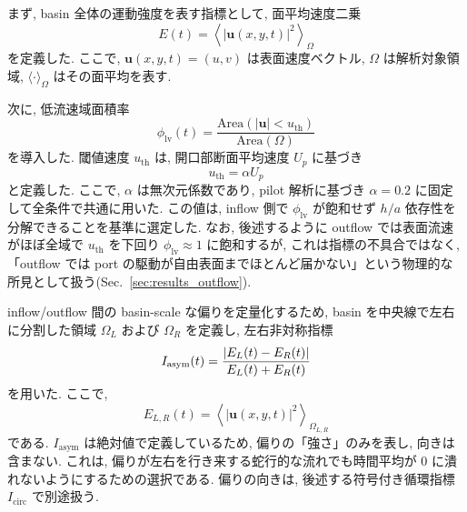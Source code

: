 まず, basin 全体の運動強度を表す指標として, 面平均速度二乗
\begin{equation}
E(t)=\left\langle |\mathbf{u}(x,y,t)|^2 \right\rangle_{\Omega}
\label{eq:E}
\end{equation}
を定義した. ここで, $\mathbf{u}(x,y,t)=(u,v)$ は表面速度ベクトル, $\Omega$ は解析対象領域, $\langle \cdot \rangle_{\Omega}$ はその面平均を表す.

次に, 低流速域面積率
\begin{equation}
\phi_{\mathrm{lv}}(t)=
\frac{\mathrm{Area}\left(|\mathbf{u}|<u_{\mathrm{th}}\right)}
{\mathrm{Area}(\Omega)}
\label{eq:phi_lv}
\end{equation}
を導入した. 閾値速度 $u_{\mathrm{th}}$ は, 開口部断面平均速度 $U_p$ に基づき
\begin{equation}
u_{\mathrm{th}}=\alpha U_p
\label{eq:uth}
\end{equation}
と定義した. ここで, $\alpha$ は無次元係数であり, pilot 解析に基づき $\alpha=0.2$ に固定して全条件で共通に用いた. この値は, inflow 側で $\phi_{\mathrm{lv}}$ が飽和せず $h/a$ 依存性を分解できることを基準に選定した. なお, 後述するように outflow では表面流速がほぼ全域で $u_{\mathrm{th}}$ を下回り $\phi_{\mathrm{lv}} \approx 1$ に飽和するが, これは指標の不具合ではなく, 「outflow では port の駆動が自由表面までほとんど届かない」という物理的な所見として扱う(Sec.~\ref{sec:results_outflow}).

inflow/outflow 間の basin-scale な偏りを定量化するため, basin を中央線で左右に分割した領域 $\Omega_L$ および $\Omega_R$ を定義し, 左右非対称指標
\begin{equation}
I_{\mathrm{asym}}(t)=
\frac{\lvert E_L(t)-E_R(t) \rvert}{E_L(t)+E_R(t)}
\label{eq:Iasym}
\end{equation}
を用いた. ここで,
\begin{equation}
E_{L,R}(t)=\left\langle |\mathbf{u}(x,y,t)|^2 \right\rangle_{\Omega_{L,R}}
\label{eq:ELR}
\end{equation}
である. $I_{\mathrm{asym}}$ は絶対値で定義しているため, 偏りの「強さ」のみを表し, 向きは含まない. これは, 偏りが左右を行き来する蛇行的な流れでも時間平均が 0 に潰れないようにするための選択である. 偏りの向きは, 後述する符号付き循環指標 $I_{\mathrm{circ}}$ で別途扱う.

